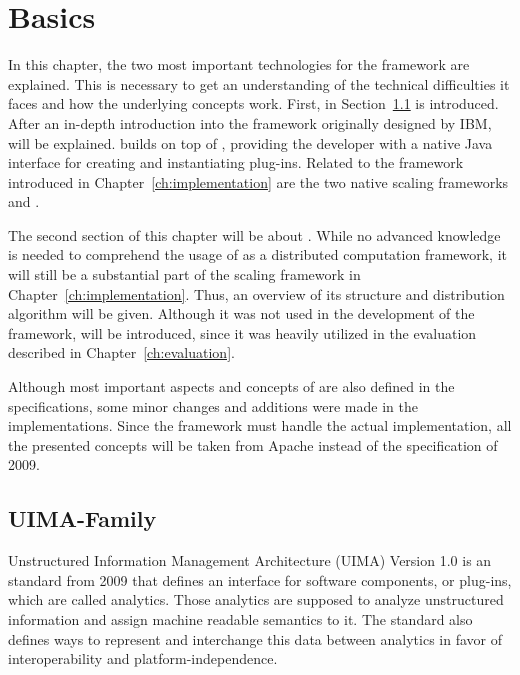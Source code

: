 
\chapter{Basics}
\label{ch:basics}
In this chapter, the two most important technologies for the framework are explained. This is necessary to get an understanding of the technical difficulties it faces and how the underlying concepts work. First, in Section~\ref{sec:uima} \uima{} is introduced. After an in-depth introduction into the framework originally designed by IBM, \uimafit{} will be explained. \uimafit{} builds on top of \uima{}, providing the developer with a native Java interface for creating and instantiating plug-ins. Related to the framework introduced in Chapter~\ref{ch:implementation} are the two native scaling frameworks \uimacpe{} and \uimaas{}. 


The second section of this chapter will be about \spark{}. While no advanced knowledge is needed to comprehend the usage of \spark{} as a distributed computation framework, it will still be a substantial part of the \uima{} scaling framework in Chapter~\ref{ch:implementation}. Thus, an overview of its structure and distribution algorithm will be given. Although it was not used in the development of the framework, \docker{} will be introduced, since it was heavily utilized in the evaluation described in Chapter~\ref{ch:evaluation}.

Although most important aspects and concepts of \uima{} are also defined in the specifications, some minor changes and additions were made in the implementations. Since the framework must handle the actual implementation, all the presented concepts will be taken from Apache \uima{} instead of the \uima{} specification of 2009.



\section{UIMA-Family}
\label{sec:uima}
Unstructured Information Management Architecture (UIMA) Version 1.0 is an \oasis{} standard from 2009 that defines an interface for software components, or plug-ins, which are called analytics. Those analytics are supposed to analyze unstructured information and assign machine readable semantics to it. The standard also defines ways to represent and interchange this data between analytics in favor of interoperability and platform-independence. 

